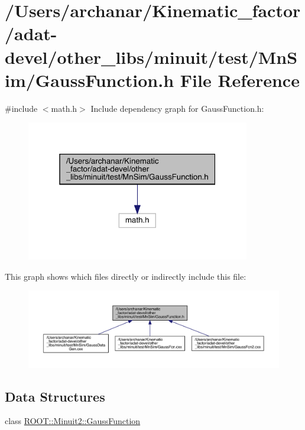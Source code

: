 \hypertarget{adat-devel_2other__libs_2minuit_2test_2MnSim_2GaussFunction_8h}{}\section{/\+Users/archanar/\+Kinematic\+\_\+factor/adat-\/devel/other\+\_\+libs/minuit/test/\+Mn\+Sim/\+Gauss\+Function.h File Reference}
\label{adat-devel_2other__libs_2minuit_2test_2MnSim_2GaussFunction_8h}
{\ttfamily \#include $<$math.\+h$>$}\newline
Include dependency graph for Gauss\+Function.\+h\+:
\nopagebreak
\begin{figure}[H]
\begin{center}
\leavevmode
\includegraphics[width=277pt]{dd/d3f/adat-devel_2other__libs_2minuit_2test_2MnSim_2GaussFunction_8h__incl}
\end{center}
\end{figure}
This graph shows which files directly or indirectly include this file\+:
\nopagebreak
\begin{figure}[H]
\begin{center}
\leavevmode
\includegraphics[width=350pt]{d9/d6e/adat-devel_2other__libs_2minuit_2test_2MnSim_2GaussFunction_8h__dep__incl}
\end{center}
\end{figure}
\subsection*{Data Structures}
\begin{DoxyCompactItemize}
\item 
class \mbox{\hyperlink{classROOT_1_1Minuit2_1_1GaussFunction}{R\+O\+O\+T\+::\+Minuit2\+::\+Gauss\+Function}}
\end{DoxyCompactItemize}
